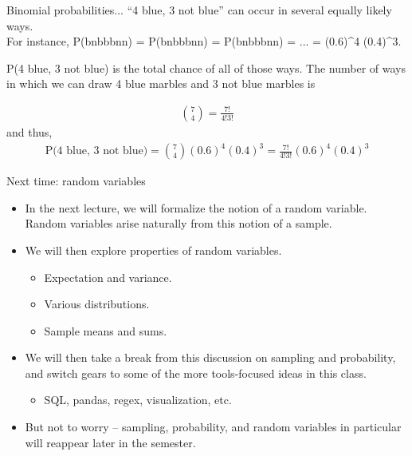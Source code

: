 \documentclass[aspectratio=169]{../latex_main/tntbeamer}  %
\begin{document}
	
		\begin{frame}{Binomial probabilities...}
	“4 blue, 3 not blue” can occur in several equally likely ways.\\                     For instance, P(bnbbbnn) = P(bnbbbnn) = P(bnbbbnn) = ... = (0.6)^4 (0.4)^3. \\         \bigskip
	    
	    P(4 blue, 3 not blue) is the total chance of all of those ways. The number of ways in which we can draw 4 blue marbles and 3 not blue marbles is

        \begin{align*}
            \binom{7}{4} = \frac{7!}{4!3!}
        \end{align*}
    and thus,
    \begin{align*}
        \text{P(4 blue, 3 not blue)} = \binom{7}{4}(0.6)^4 (0.4)^3 = \frac{7!}{4!3!}(0.6)^4 (0.4)^3
    \end{align*}

	\end{frame}
	
	
	\begin{frame}{Next time: random variables}
    	\begin{itemize}
    	    \item In the next lecture, we will formalize the notion of a random variable. Random variables arise naturally from this notion of a sample.
    	    \item We will then explore properties of random variables. 
    	    \begin{itemize}
    	        \item Expectation and variance.
    	        \item Various distributions.
    	        \item Sample means and sums.
    	    \end{itemize}
    	    \item We will then take a break from this discussion on sampling and probability, and switch gears to some of the more tools-focused ideas in this class. 
    	    \begin{itemize}
    	        \item SQL, pandas, regex, visualization, etc.
    	    \end{itemize}
    	    \item But not to worry – sampling, probability, and random variables in particular will reappear later in the semester.
    	\end{itemize}

	\end{frame}
\end{document}
